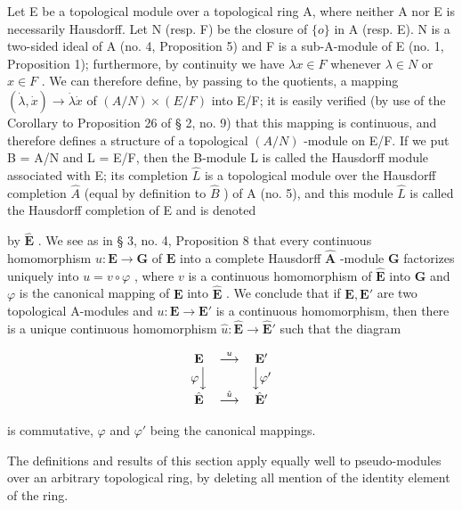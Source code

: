 Let E be a topological module over a topological ring A, where neither A nor E is necessarily Hausdorff. Let N (resp. F) be the closure of \(\{o\}\) in A (resp. E). N is a two-sided ideal of A (no. 4, Proposition 5) and F is a sub-A-module of E (no. 1, Proposition 1); furthermore, by continuity we have \(\lambda x \in F\) whenever \(\lambda \in N\) or \(x \in F\) . We can therefore define, by passing to the quotients, a mapping \((\dot{\lambda}, \dot{x}) \to \dot{\lambda} \dot{x}\) of \((A/N) \times (E/F)\) into E/F; it is easily verified (by use of the Corollary to Proposition 26 of § 2, no. 9) that this mapping is continuous, and therefore defines a structure of a topological \((A/N)\) -module on E/F. If we put B = A/N and L = E/F, then the B-module L is called the Hausdorff module associated with E; its completion \(\hat{L}\) is a topological module over the Hausdorff completion \(\hat{A}\) (equal by definition to \(\hat{B}\) ) of A (no. 5), and this module \(\hat{L}\) is called the Hausdorff completion of E and is denoted

by \(\hat{\mathbf{E}}\) . We see as in § 3, no. 4, Proposition 8 that every continuous homomorphism \(u: \mathbf{E} \to \mathbf{G}\) of \(\mathbf{E}\) into a complete Hausdorff \(\hat{\mathbf{A}}\) -module \(\mathbf{G}\) factorizes uniquely into \(u = v \circ \varphi\) , where \(v\) is a continuous homomorphism of \(\hat{\mathbf{E}}\) into \(\mathbf{G}\) and \(\varphi\) is the canonical mapping of \(\mathbf{E}\) into \(\hat{\mathbf{E}}\) . We conclude that if \(\mathbf{E}, \mathbf{E}'\) are two topological A-modules and \(u: \mathbf{E} \to \mathbf{E}'\) is a continuous homomorphism, then there is a unique continuous homomorphism \(\hat{u}: \hat{\mathbf{E}} \to \hat{\mathbf{E}}'\) such that the diagram

\[
\begin{array}{c c c} \mathbf {E} & \stackrel {{u}} {{\longrightarrow}} & \mathbf {E} ^ {\prime} \\ \varphi \Big \downarrow & & \Big \downarrow \varphi^ {\prime} \\ \hat {\mathbf {E}} & \stackrel {{\hat {u}}} {{\longrightarrow}} & \hat {\mathbf {E}} ^ {\prime} \end{array}
\]

is commutative, \(\varphi\) and \(\varphi'\) being the canonical mappings.

The definitions and results of this section apply equally well to pseudo-modules over an arbitrary topological ring, by deleting all mention of the identity element of the ring.

